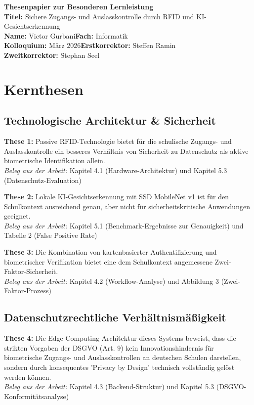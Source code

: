 \documentclass[11pt,a4paper]{article}
\newcommand{\blltitle}{Sichere Zugangs- und Auslasskontrolle durch RFID und KI-Gesichtserkennung}
\newcommand{\studentname}{Victor Gurbani}
\newcommand{\examdate}{März 2026}
\newcommand{\fachname}{Informatik}
\begin{document}
{\Large\textbf{Thesenpapier zur Besonderen Lernleistung}}\\
\textbf{Titel:} \blltitle\\
\textbf{Name:} \studentname \hfill \textbf{Fach:} \fachname\\
\textbf{Kolloquium:} \examdate \hfill \textbf{Erstkorrektor:} Steffen Ramin\\
\textbf{Zweitkorrektor:} Stephan Seel

\vspace{0.8cm}
\section*{Kernthesen}
\subsection*{Technologische Architektur \& Sicherheit}

\textbf{These 1:} Passive RFID-Technologie bietet für die schulische Zugangs- und Auslasskontrolle ein besseres Verhältnis von Sicherheit zu Datenschutz als aktive biometrische Identifikation allein.\\
\textit{Beleg aus der Arbeit:} Kapitel 4.1 (Hardware-Architektur) und Kapitel 5.3 (Datenschutz-Evaluation)

\textbf{These 2:} Lokale KI-Gesichtserkennung mit SSD MobileNet v1 ist für den Schulkontext ausreichend genau, aber nicht für sicherheitskritische Anwendungen geeignet.\\
\textit{Beleg aus der Arbeit:} Kapitel 5.1 (Benchmark-Ergebnisse zur Genauigkeit) und Tabelle 2 (False Positive Rate)

\textbf{These 3:} Die Kombination von kartenbasierter Authentifizierung und biometrischer Verifikation bietet eine dem Schulkontext angemessene Zwei-Faktor-Sicherheit.\\
\textit{Beleg aus der Arbeit:} Kapitel 4.2 (Workflow-Analyse) und Abbildung 3 (Zwei-Faktor-Prozess)

\subsection*{Datenschutzrechtliche Verhältnismäßigkeit}

\textbf{These 4:} Die Edge-Computing-Architektur dieses Systems beweist, dass die strikten Vorgaben der DSGVO (Art. 9) kein Innovationshindernis für biometrische Zugangs- und Auslasskontrollen an deutschen Schulen darstellen, sondern durch konsequentes 'Privacy by Design' technisch vollständig gelöst werden können.\\
\textit{Beleg aus der Arbeit:} Kapitel 4.3 (Backend-Struktur) und Kapitel 5.3 (DSGVO-Konformitätsanalyse)
\end{document}
